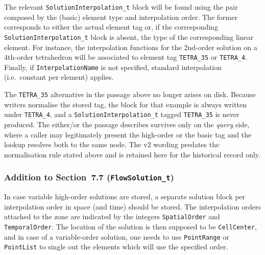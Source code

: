 \documentclass[11pt,letterpaper]{article}
\newenvironment{v2quote}
  {\begin{v2quoteframe}%
   \noindent{\footnotesize\sffamily\bfseries\color{cgnsblue}v2 text}%
   \nopagebreak\par\nopagebreak\vspace{0.15em}}
  {\end{v2quoteframe}}
\begin{document}
\begin{v2quote}
The relevant \texttt{SolutionInterpolation\_t} block will be found using the pair composed by
the (basic) element type and interpolation order.  The former corresponds to either the actual
element tag or, if the corresponding \texttt{SolutionInterpolation\_t} block is absent, the type
of the corresponding linear element.  For instance, the interpolation functions for the 2nd-order
solution on a 4th-order tetrahedron will be associated to element tag \texttt{TETRA\_35} or
\texttt{TETRA\_4}.  Finally, if \texttt{InterpolationName} is not specified, standard
interpolation (i.e.\ constant per element) applies.
\end{v2quote}

\noindent The \texttt{TETRA\_35} alternative in the passage above no longer arises on disk.
Because writers normalise the stored tag, the block for that example is always written under
\texttt{TETRA\_4}, and a \texttt{SolutionInterpolation\_t} tagged \texttt{TETRA\_35} is never
produced.  The either/or the passage describes survives only on the \emph{query} side, where a
caller may legitimately present the high-order or the basic tag and the lookup resolves both to
the same node.  The v2 wording predates the normalisation rule stated above and is retained
here for the historical record only.

\subsubsection{Addition to Section~7.7 (\texttt{FlowSolution\_t})}
\label{sec:flowsolution}

\begin{v2quote}
In case variable high-order solutions are stored, a separate solution block per interpolation
order in space (and time) should be stored.  The interpolation orders attached to the zone are
indicated by the integers \texttt{SpatialOrder} and \texttt{TemporalOrder}.  The location of
the solution is then supposed to be \texttt{CellCenter}, and in case of a variable-order
solution, one needs to use \texttt{PointRange} or \texttt{PointList} to single out the elements
which will use the specified order.
\end{v2quote}
\end{document}
